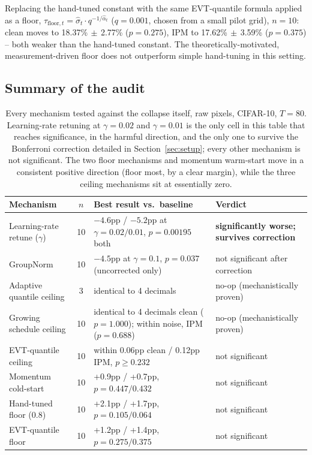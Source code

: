 \documentclass{article}
\begin{document}
Replacing the hand-tuned constant with the same EVT-quantile formula applied as
a floor, $\tau_{\mathrm{floor},t} = \hat\sigma_t \cdot q^{-1/\hat\alpha_t}$
($q{=}0.001$, chosen from a small pilot grid), $n{=}10$: clean moves to
18.37\%$\,\pm\,$2.77\% ($p{=}0.275$), IPM to 17.62\%$\,\pm\,$3.59\%
($p{=}0.375$) -- both weaker than the hand-tuned constant. The
theoretically-motivated, measurement-driven floor does not outperform simple
hand-tuning in this setting.

\subsection{Summary of the audit}
\label{sec:audit-summary}

\begin{table}[t]
\centering\footnotesize
\begin{tabular}{p{2.7cm}cp{5.8cm}p{2.9cm}}
\toprule
Mechanism & $n$ & Best result vs.\ baseline & Verdict \\
\midrule
Learning-rate retune ($\gamma$) & 10 & $-4.6$pp / $-5.2$pp at $\gamma{=}0.02/0.01$, $p{=}0.00195$ both & \textbf{significantly worse; survives correction} \\
GroupNorm & 10 & $-4.5$pp at $\gamma{=}0.1$, $p{=}0.037$ (uncorrected only) & not significant after correction \\
Adaptive quantile ceiling & 3 & identical to 4 decimals & no-op (mechanistically proven) \\
Growing schedule ceiling & 10 & identical to 4 decimals clean ($p{=}1.000$); within noise, IPM ($p{=}0.688$) & no-op (mechanistically proven) \\
EVT-quantile ceiling & 10 & within 0.06pp clean / 0.12pp IPM, $p{\geq}0.232$ & not significant \\
Momentum cold-start & 10 & +0.9pp / +0.7pp, $p{=}0.447/0.432$ & not significant \\
Hand-tuned floor (0.8) & 10 & +2.1pp / +1.7pp, $p{=}0.105/0.064$ & not significant \\
EVT-quantile floor & 10 & +1.2pp / +1.4pp, $p{=}0.275/0.375$ & not significant \\
\bottomrule
\end{tabular}
\caption{Every mechanism tested against the collapse itself, raw pixels,
CIFAR-10, $T{=}80$. Learning-rate retuning at $\gamma{=}0.02$ and $\gamma{=}0.01$
is the only cell in this table that reaches significance, in the harmful
direction, and the only one to survive the Bonferroni correction detailed in
Section~\ref{sec:setup}; every other mechanism is not significant. The two
floor mechanisms and momentum warm-start move in a consistent positive
direction (floor most, by a clear margin), while the three ceiling mechanisms
sit at essentially zero.}
\label{tab:audit-summary}
\end{table}
\end{document}
